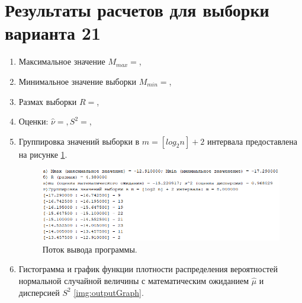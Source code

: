 \documentclass[a4paper,oneside,12pt]{extreport}
\theoremstyle{indented}
\begin{document}
\section{Результаты расчетов для выборки варианта 21} 

\begin{enumerate}
\item Максимальное значение $M_{max} = $,
\item Минимальное значение выборки $M_{min} = $,
\item Размах выборки $R = $,
\item Оценки: $\hat \nu = , S^2 = $,
\item Группировка значений выборки в $m = [log_2 n] + 2$ интервала предоставлена на рисунке \ref{img:output}.

\begin{figure}[H]
\begin{center}
\includegraphics[scale=0.28]{inc/img/output.png}
\captionsetup{justification=centering}
	\caption{Поток вывода программы.}
	\label{img:output}	
\end{center}
\end{figure}

\item Гистограмма и график функции плотности распределения вероятностей нормальной случайной величины с математическим ожиданием $\hat \mu$ и дисперсией $S^2$ \ref{img:outputGraph}. 


\end{enumerate}
\end{document}

